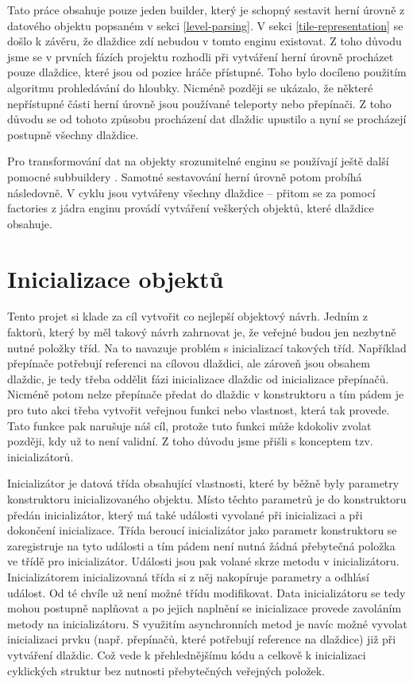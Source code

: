 Tato práce obsahuje pouze jeden builder, který je schopný sestavit herní úrovně z datového objektu popsaném v sekci \ref{level-parsing}.
V sekci \ref{tile-representation} se došlo k závěru, že dlaždice zdí nebudou v tomto enginu existovat. Z toho důvodu jsme se 
v prvních fázích projektu rozhodli při vytváření herní úrovně procházet pouze dlaždice, které jsou od pozice hráče přístupné.
Toho bylo docíleno použitím algoritmu prohledávání do hloubky. Nicméně později se ukázalo, že některé nepřístupné části herní úrovně
jsou používané teleporty nebo přepínači. Z toho důvodu se od tohoto způsobu procházení dat dlaždic upustilo a nyní se procházejí 
postupně všechny dlaždice.

Pro transformování dat na objekty srozumitelné enginu se používají ještě další pomocné subbuildery . 
Samotné sestavování herní úrovně potom probíhá následovně. V cyklu jsou vytvářeny všechny dlaždice -- přitom se za pomocí factories 
z jádra enginu provádí vytváření veškerých objektů, které dlaždice obsahuje.


\section{Inicializace objektů}\label{level-inicialization}

Tento projet si klade za cíl  vytvořit co nejlepší objektový návrh. Jedním z faktorů, který by měl takový návrh
zahrnovat je, že veřejné budou jen nezbytně nutné položky tříd. Na to navazuje problém s inicializací takových tříd. 
Například přepínače potřebují referenci na cílovou dlaždici, ale zároveň jsou obsahem dlaždic, je tedy třeba oddělit fázi inicializace 
dlaždic od inicializace přepínačů. Nicméně potom nelze přepínače předat do dlaždic v konstruktoru a tím pádem je pro tuto akci třeba 
vytvořit veřejnou funkci nebo vlastnost, která tak provede. Tato funkce pak narušuje náš cíl, protože tuto funkci může kdokoliv
zvolat později, kdy už to není validní. Z toho důvodu jsme přišli s konceptem tzv. inicializátorů.

Inicializátor je datová třída obsahující vlastnosti, které by běžně byly parametry konstruktoru inicializovaného objektu.
Místo těchto parametrů je do konstruktoru předán inicializátor, který má také události vyvolané
při inicializaci a při dokončení inicializace. Třída beroucí inicializátor jako parametr konstruktoru se zaregistruje na tyto události a
tím pádem není nutná žádná přebytečná položka ve třídě pro inicializátor. Události jsou pak volané skrze metodu v inicializátoru.
Inicializátorem inicializovaná třída si z něj nakopíruje parametry a odhlásí událost. Od té chvíle už není možné třídu modifikovat.
Data inicializátoru se tedy mohou postupně naplňovat a po jejich naplnění se inicializace provede zavoláním metody na inicializátoru.
S využitím asynchronních metod je navíc možné vyvolat inicializaci prvku  (např. přepínačů, které potřebují reference na dlaždice) 
již při vytváření dlaždic. Což vede k přehlednějšímu kódu a celkově k inicializaci cyklických struktur bez nutnosti přebytečných 
veřejných položek. 

